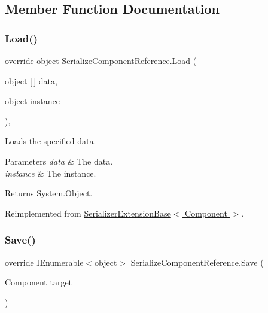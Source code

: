 \subsection{Member Function Documentation}
\mbox{\label{class_serialize_component_reference_aee8108ae073c2c74d95244f2bd10cc8c}} 
\subsubsection{\texorpdfstring{Load()}{Load()}}
{\footnotesize\ttfamily override object Serialize\+Component\+Reference.\+Load (\begin{DoxyParamCaption}\item[{object \mbox{[}$\,$\mbox{]}}]{data,  }\item[{object}]{instance }\end{DoxyParamCaption})\hspace{0.3cm}{\ttfamily [inline]}, {\ttfamily [virtual]}}



Loads the specified data. 


\begin{DoxyParams}{Parameters}
{\em data} & The data.\\
\hline
{\em instance} & The instance.\\
\hline
\end{DoxyParams}
\begin{DoxyReturn}{Returns}
System.\+Object.
\end{DoxyReturn}


Reimplemented from \hyperlink{class_serializer_extension_base_a3792a9b27056e30ca0ac91531936ae47}{Serializer\+Extension\+Base$<$ Component $>$}.

\mbox{\label{class_serialize_component_reference_af5ca5949f4c6d435bf8af4bb3718982c}} 
\subsubsection{\texorpdfstring{Save()}{Save()}}
{\footnotesize\ttfamily override I\+Enumerable$<$object$>$ Serialize\+Component\+Reference.\+Save (\begin{DoxyParamCaption}\item[{Component}]{target }\end{DoxyParamCaption})\hspace{0.3cm}{\ttfamily [inline]}}



